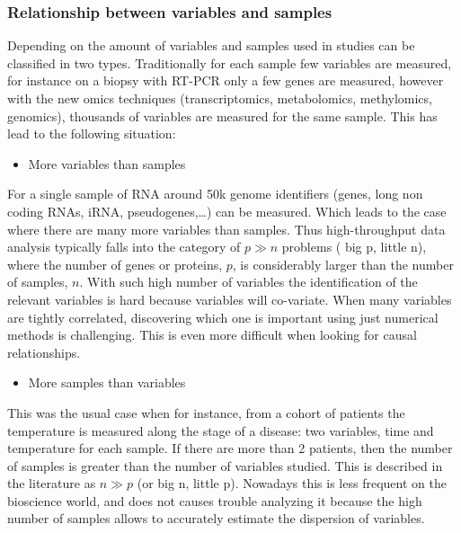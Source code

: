 \documentclass[
  a4paper,
]{book}
\providecommand{\tightlist}{%
  \setlength{\itemsep}{0pt}\setlength{\parskip}{0pt}}
\begin{document}
\hypertarget{relationship-between-variables-and-samples}{%
\subsubsection{Relationship between variables and samples}\label{relationship-between-variables-and-samples}}

Depending on the amount of variables and samples used in studies can be classified in two types.
Traditionally for each sample few variables are measured, for instance on a biopsy with RT-PCR only a few genes are measured, however with the new omics techniques (transcriptomics, metabolomics, methylomics, genomics), thousands of variables are measured for the same sample.
This has lead to the following situation:

\begin{itemize}
\tightlist
\item
  More variables than samples
\end{itemize}

For a single sample of RNA around 50k genome identifiers (genes, long non coding RNAs, iRNA, pseudogenes,\ldots) can be measured.
Which leads to the case where there are many more variables than samples.
Thus high-throughput data analysis typically falls into the category of \(p \gg n\) problems ( big p, little n), where the number of genes or proteins, \(p\), is considerably larger than the number of samples, \(n\).
With such high number of variables the identification of the relevant variables is hard because variables will co-variate.
When many variables are tightly correlated, discovering which one is important using just numerical methods is challenging.
This is even more difficult when looking for causal relationships.

\begin{itemize}
\tightlist
\item
  More samples than variables
\end{itemize}

This was the usual case when for instance, from a cohort of patients the temperature is measured along the stage of a disease: two variables, time and temperature for each sample.
If there are more than 2 patients, then the number of samples is greater than the number of variables studied.
This is described in the literature as \(n \gg p\) (or big n, little p).
Nowadays this is less frequent on the bioscience world, and does not causes trouble analyzing it because the high number of samples allows to accurately estimate the dispersion of variables.
\end{document}
